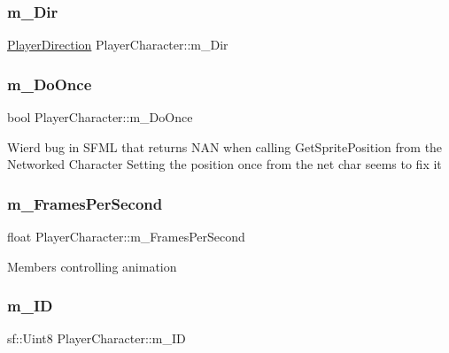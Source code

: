 \subsubsection{\texorpdfstring{m\+\_\+\+Dir}{m\_Dir}}
{\footnotesize\ttfamily \hyperlink{_player_character_8h_af5420be377752b383864a169dfd7ba10}{Player\+Direction} Player\+Character\+::m\+\_\+\+Dir\hspace{0.3cm}{\ttfamily [protected]}}

\hypertarget{class_player_character_a2c8e033c4db7139172041a4476ef1534}{}\label{class_player_character_a2c8e033c4db7139172041a4476ef1534} 
\subsubsection{\texorpdfstring{m\+\_\+\+Do\+Once}{m\_DoOnce}}
{\footnotesize\ttfamily bool Player\+Character\+::m\+\_\+\+Do\+Once\hspace{0.3cm}{\ttfamily [protected]}}

Wierd bug in S\+F\+ML that returns N\+AN when calling Get\+Sprite\+Position from the Networked Character Setting the position once from the net char seems to fix it \hypertarget{class_player_character_a45f3c61083c1db2753500d8e217ca463}{}\label{class_player_character_a45f3c61083c1db2753500d8e217ca463} 
\subsubsection{\texorpdfstring{m\+\_\+\+Frames\+Per\+Second}{m\_FramesPerSecond}}
{\footnotesize\ttfamily float Player\+Character\+::m\+\_\+\+Frames\+Per\+Second\hspace{0.3cm}{\ttfamily [protected]}}

Members controlling animation \hypertarget{class_player_character_ab3ae00b8837356dd6bdb86d90a941cad}{}\label{class_player_character_ab3ae00b8837356dd6bdb86d90a941cad} 
\subsubsection{\texorpdfstring{m\+\_\+\+ID}{m\_ID}}
{\footnotesize\ttfamily sf\+::\+Uint8 Player\+Character\+::m\+\_\+\+ID\hspace{0.3cm}{\ttfamily [protected]}}

